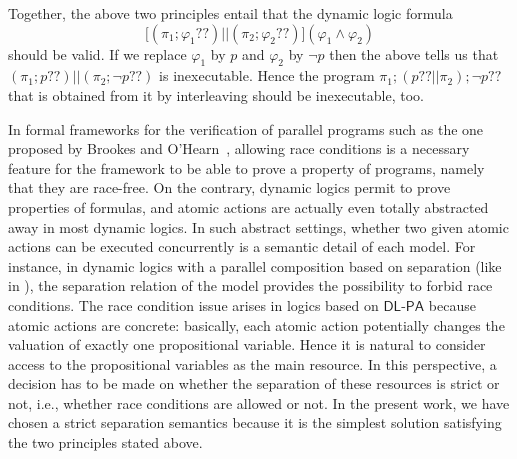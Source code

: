 \documentclass{llncs}
\newcommand{\pll}{ {||} }							%
\newcommand{\testendo}{?\!\!?}			%
\newcommand{\Dlpa}{\ensuremath{\mathsf{DL\text{-}PA}}\xspace}
\newcommand{\ah}[1]{\footnote{\textbf{AH:} #1}}
\newcommand{\lbox}[1]{ \big[ #1 \big] }
\renewcommand{\phi}{\varphi}
\begin{document}
Together, the above two principles entail that the dynamic logic formula
$$ \lbox{ (\pi_1 ; \phi_1 \testendo ) \pll (\pi_2 ; \phi_2 \testendo ) } (\phi_1 \land \phi_2) $$
should be valid. 
If we replace $\phi_1$ by $p$ and $\phi_2$ by $\lnot p$ then the above tells us that 
$(\pi_1 ; p \testendo ) \pll (\pi_2 ; \lnot p \testendo )$ is inexecutable. 
Hence the program
$\pi_1 ; (p \testendo \pll \pi_2) ; \lnot p \testendo $ 
that is obtained from it by interleaving should be inexecutable, too. 

In formal frameworks for the verification of parallel programs such as the one proposed by Brookes 
and O'Hearn~\cite{Brookes04,OHearn04}, allowing race conditions is a necessary feature for the 
framework to be able to prove a property of programs, namely that they are race-free. 
On the contrary, dynamic logics permit to prove properties of formulas, and atomic actions are actually even totally abstracted away in most dynamic logics. 
In such abstract settings,
whether two given atomic actions can be executed concurrently is a semantic detail of each model.
For instance, in dynamic logics with a parallel composition based on separation (like in
\cite{DBLP:journals/entcs/BenevidesFV11,Boudou16,DBLP:journals/logcom/BalbianiB18}),
the separation relation of the model provides the possibility to forbid race conditions.
The race condition issue arises in logics based on \Dlpa because atomic actions are concrete:
basically, each atomic action potentially changes the valuation of exactly one propositional variable.
Hence it is natural to consider access to the propositional variables as the main resource. 
In this perspective, a decision has to be made on whether the separation of these resources is strict or not, 
i.e., whether race conditions are allowed or not.
In the present work, we have chosen a strict separation semantics because it is the simplest solution satisfying
the two principles stated above.
\end{document}

